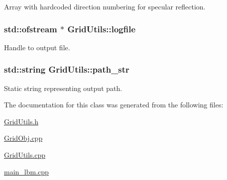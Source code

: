 Array with hardcoded direction numbering for specular reflection. 

\subsubsection[{\texorpdfstring{logfile}{logfile}}]{\setlength{\rightskip}{0pt plus 5cm}std\+::ofstream $\ast$ Grid\+Utils\+::logfile\hspace{0.3cm}{\ttfamily [static]}}\hypertarget{class_grid_utils_a298239096e929c1ba4eba925e351c1b3}{}\label{class_grid_utils_a298239096e929c1ba4eba925e351c1b3}


Handle to output file. 

\subsubsection[{\texorpdfstring{path\+\_\+str}{path_str}}]{\setlength{\rightskip}{0pt plus 5cm}std\+::string Grid\+Utils\+::path\+\_\+str\hspace{0.3cm}{\ttfamily [static]}}\hypertarget{class_grid_utils_a9b58748e9e05e84852962d7abc7942e3}{}\label{class_grid_utils_a9b58748e9e05e84852962d7abc7942e3}


Static string representing output path. 



The documentation for this class was generated from the following files\+:\begin{DoxyCompactItemize}
\item 
\hyperlink{_grid_utils_8h}{Grid\+Utils.\+h}\item 
\hyperlink{_grid_obj_8cpp}{Grid\+Obj.\+cpp}\item 
\hyperlink{_grid_utils_8cpp}{Grid\+Utils.\+cpp}\item 
\hyperlink{main__lbm_8cpp}{main\+\_\+lbm.\+cpp}\end{DoxyCompactItemize}
